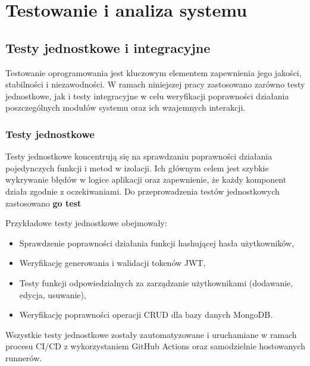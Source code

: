 \chapter{Testowanie i analiza systemu}

\section{Testy jednostkowe i integracyjne}
Testowanie oprogramowania jest kluczowym elementem zapewnienia jego jakości, stabilności i niezawodności. W ramach niniejszej pracy zastosowano zarówno testy jednostkowe, jak i testy integracyjne w celu weryfikacji poprawności działania poszczególnych modułów systemu oraz ich wzajemnych interakcji.

\subsection{Testy jednostkowe}

Testy jednostkowe koncentrują się na sprawdzaniu poprawności działania pojedynczych funkcji i metod w izolacji. Ich głównym celem jest szybkie wykrywanie błędów w logice aplikacji oraz zapewnienie, że każdy komponent działa zgodnie z oczekiwaniami. Do przeprowadzenia testów jednostkowych zastosowano \textbf{go test}

Przykładowe testy jednostkowe obejmowały:
\begin{itemize}
    \item Sprawdzenie poprawności działania funkcji hashującej hasła użytkowników,
    \item Weryfikację generowania i walidacji tokenów JWT,
    \item Testy funkcji odpowiedzialnych za zarządzanie użytkownikami (dodawanie, edycja, usuwanie),
    \item Weryfikację poprawności operacji CRUD dla bazy danych MongoDB.
\end{itemize}

Wszystkie testy jednostkowe zostały zautomatyzowane i uruchamiane w ramach procesu CI/CD z wykorzystaniem GitHub Actions oraz samodzielnie hostowanych runnerów.

